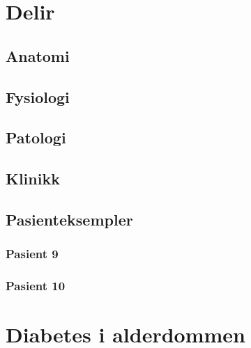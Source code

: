 \documentclass[a4paper,12pt,twoside]{memoir}
\begin{document}
\sffamily

			\renewcommand{\chaptername}{Del}
            \renewcommand{\contentsname}{Innhold}
            \renewcommand\listfigurename{Illustrasjoner}
            \renewcommand\tablename{Tabell}
			\renewcommand\listtablename{Tabeller}
            \renewcommand{\figurename}{Illustrasjon}


\frontmatter
	
	
\mainmatter
	
	\chapter{Delir}%
		\section{Anatomi}
		\section{Fysiologi}
		\section{Patologi}
		\section{Klinikk}
		\section{Pasienteksempler}
			\subsection{Pasient 9}
			\subsection{Pasient 10}
	\chapter{Diabetes i alderdommen}%
\end{document}

